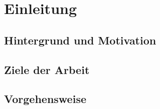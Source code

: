 \chapter{Einleitung}
\label{cha:einleitung}

\section{Hintergrund und Motivation}
\label{sec:motivation}

\section{Ziele der Arbeit}
\label{sec:goal}

\section{Vorgehensweise}
\label{sec:doing}

